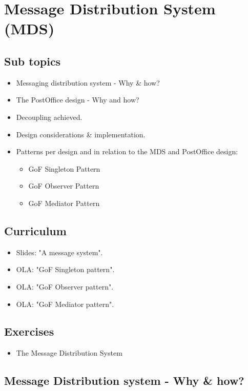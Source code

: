 \section{Message Distribution System (MDS)}

\subsection{Sub topics}

\begin{itemize}
	\item Messaging distribution system - Why \& how?
	\item The PostOffice design - Why and how?
	\item Decoupling achieved.
	\item Design considerations \& implementation.
	\item Patterns per design and in relation to the MDS and PostOffice design:
	\begin{itemize}
		\item GoF Singleton Pattern
		\item GoF Observer Pattern
		\item GoF Mediator Pattern
	\end{itemize}
\end{itemize}

\subsection{Curriculum}

\begin{itemize}
	\item Slides: "A message system".
	\item OLA: "GoF Singleton pattern".
	\item OLA: "GoF Observer pattern".
	\item OLA: "GoF Mediator pattern".
\end{itemize}

\subsection{Exercises}

\begin{itemize}
	\item The Message Distribution System
\end{itemize}

\subsection{Message Distribution system - Why \& how?}

